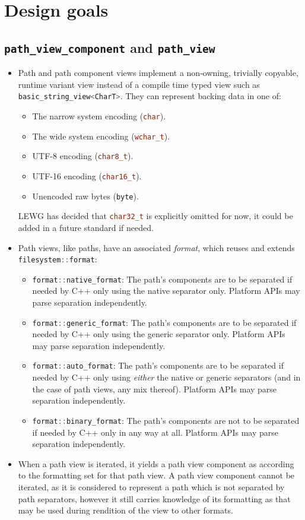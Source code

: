 \documentclass[11pt]{article}
\newcommand{\code}[2][cpp]{\lstinline[language=#1,basicstyle=\small\ttfamily]{#2}}
\begin{document}
\section{Design goals}

\subsection{\code{path_view_component} and \code{path_view}}

\begin{itemize}
    \item Path and path component views implement a non-owning, trivially copyable, runtime variant view instead of a compile time typed view such as \code{basic_string_view<CharT>}. They can represent backing data in one of:
    \begin{itemize}
        \item The narrow system encoding (\code{char}).
        \item The wide system encoding (\code{wchar_t}).
        \item UTF-8 encoding (\code{char8_t}).
        \item UTF-16 encoding (\code{char16_t}).
        \item Unencoded raw bytes (\code{byte}).
    \end{itemize}
    LEWG has decided that \code{char32_t} is explicitly omitted for now, it could be added in a future standard if needed.
    \item Path views, like paths, have an associated \emph{format}, which reuses and extends \code{filesystem::format}:
    \begin{itemize}
        \item \code{format::native_format}: The path's components are to be separated if needed by C++ only using the native separator only. Platform APIs may parse separation independently.
        \item \code{format::generic_format}: The path's components are to be separated if needed by C++ only using the generic separator only. Platform APIs may parse separation independently.
        \item \code{format::auto_format}: The path's components are to be separated if needed by C++ only using \emph{either} the native or generic separators (and in the case of path views, any mix thereof). Platform APIs may parse separation independently.
        \item \code{format::binary_format}: The path's components are not to be separated if needed by C++ only in any way at all. Platform APIs may parse separation independently.
    \end{itemize}
    \item When a path view is iterated, it yields a path view component as according to the formatting set for that path view. A path view component cannot be iterated, as it is considered to represent a path which is not separated by path separators, however it still carries knowledge of its formatting as that may be used during rendition of the view to other formats.
    

\end{itemize}
\end{document}

